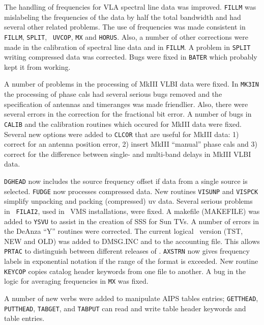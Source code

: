 The handling of frequencies for VLA spectral line data was improved.
{\tt FILLM} was mislabeling the frequencies of the data by half the
total bandwidth and had several other related problems.  The use of
frequencies was made consistent in {\tt FILLM}, {\tt SPLIT}, {\tt
UVCOP}, {\tt MX} and {\tt HORUS}.  Also, a number of other corrections
were made in the calibration of spectral line data and in {\tt FILLM}.
A problem in {\tt SPLIT} writing compressed data was corrected.
Bugs were fixed in {\tt BATER} which probably kept it from working.

A number of problems in the processing of MkIII VLBI data were fixed.
In {\tt MK3IN} the processing of phase cals had several serious bugs
removed and the specification of antennas and timeranges was made
friendlier.  Also, there were several errors in the correction for the
fractional bit error.  A number of bugs in {\tt CALIB} and the
calibration routines which occured for MkIII data were fixed.
Several new options were added to {\tt CLCOR} that are useful for
MkIII data: 1) correct for an antenna position error, 2) insert MkIII
``manual'' phase cals and 3) correct for the difference between
single- and multi-band delays in MkIII VLBI data.



{\tt DGHEAD} now includes the source frequency offset if data from a
single source is selected. {\tt FUDGE} now processes compressed data.
New routines {\tt VISUNP} and {\tt VISPCK} simplify unpacking and
packing (compressed) uv data.  Several serious problems in {\tt
FILAI2}, used in \AIPS\ VMS installations, were fixed.  A makefile
(MAKEFILE) was added to {\tt YSVU} to assist in the creation of SSS
for Sun TVs.  A number of errors in the DeAnza ``Y'' routines were
corrected.
The current logical \AIPS\ version (TST, NEW and OLD) was
added to DMSG.INC and to the accounting file.  This allows {\tt PRTAC}
to distinguish between different releases of \AIPS.  {\tt AXSTRN} now
gives frequency labels in exponential notation if the range of the
format is exceeded.  New routine {\tt KEYCOP} copies catalog header
keywords from one file to another.  A bug in the logic for averaging
frequencies in {\tt MX} was fixed.


   A number of new verbs were added to manipulate AIPS tables entries;
{\tt GETTHEAD}, {\tt PUTTHEAD}, {\tt TABGET}, and {\tt TABPUT} can
read and write table header keywords and table entries.

